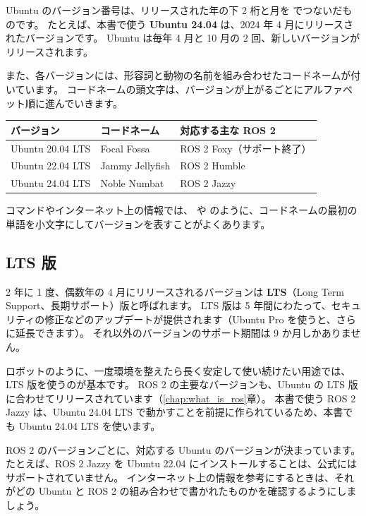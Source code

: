Ubuntu のバージョン番号は、リリースされた年の下 2 桁と月を  でつないだものです。
たとえば、本書で使う \textbf{Ubuntu 24.04} は、2024 年 4 月にリリースされたバージョンです。
Ubuntu は毎年 4 月と 10 月の 2 回、新しいバージョンがリリースされます。

また、各バージョンには、形容詞と動物の名前を組み合わせたコードネームが付いています。
コードネームの頭文字は、バージョンが上がるごとにアルファベット順に進んでいきます。

\begin{tablebox}
  \begin{tabular}{lll}
    \toprule
    バージョン & コードネーム & 対応する主な ROS 2 \\
    \midrule
    Ubuntu 20.04 LTS & Focal Fossa & ROS 2 Foxy（サポート終了） \\
    Ubuntu 22.04 LTS & Jammy Jellyfish & ROS 2 Humble \\
    Ubuntu 24.04 LTS & Noble Numbat & ROS 2 Jazzy \\
    \bottomrule
  \end{tabular}
\end{tablebox}

コマンドやインターネット上の情報では、 や  のように、コードネームの最初の単語を小文字にしてバージョンを表すことがよくあります。

\subsection{LTS 版}

2 年に 1 度、偶数年の 4 月にリリースされるバージョンは \textbf{LTS}（Long Term Support、長期サポート）版と呼ばれます。
LTS 版は 5 年間にわたって、セキュリティの修正などのアップデートが提供されます（Ubuntu Pro を使うと、さらに延長できます）。
それ以外のバージョンのサポート期間は 9 か月しかありません。

ロボットのように、一度環境を整えたら長く安定して使い続けたい用途では、LTS 版を使うのが基本です。
ROS 2 の主要なバージョンも、Ubuntu の LTS 版に合わせてリリースされています（\ref{chap:what_is_ros}章）。
本書で使う ROS 2 Jazzy は、Ubuntu 24.04 LTS で動かすことを前提に作られているため、本書でも Ubuntu 24.04 LTS を使います。

\begin{caution}
  ROS 2 のバージョンごとに、対応する Ubuntu のバージョンが決まっています。
  たとえば、ROS 2 Jazzy を Ubuntu 22.04 にインストールすることは、公式にはサポートされていません。
  インターネット上の情報を参考にするときは、それがどの Ubuntu と ROS 2 の組み合わせで書かれたものかを確認するようにしましょう。
\end{caution}

